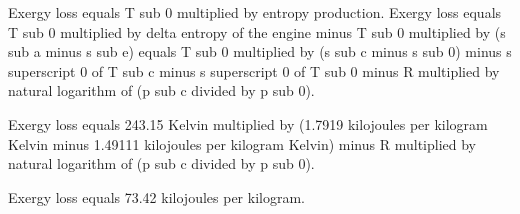 Exergy loss equals T sub 0 multiplied by entropy production.  
Exergy loss equals T sub 0 multiplied by delta entropy of the engine minus T sub 0 multiplied by (s sub a minus s sub e) equals T sub 0 multiplied by (s sub c minus s sub 0) minus s superscript 0 of T sub c minus s superscript 0 of T sub 0 minus R multiplied by natural logarithm of (p sub c divided by p sub 0).  

Exergy loss equals 243.15 Kelvin multiplied by (1.7919 kilojoules per kilogram Kelvin minus 1.49111 kilojoules per kilogram Kelvin) minus R multiplied by natural logarithm of (p sub c divided by p sub 0).  

Exergy loss equals 73.42 kilojoules per kilogram.